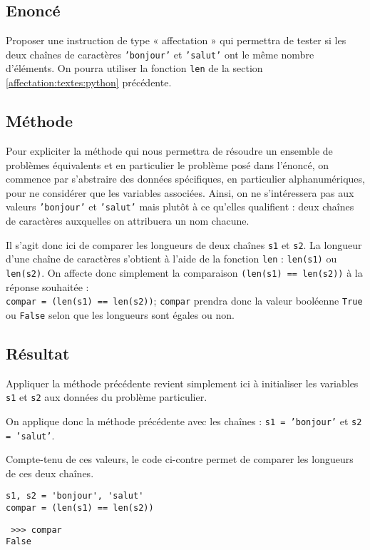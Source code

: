 \subsection{Enoncé}\label{affectation:textes:enonce}
Proposer une instruction de type « affectation » qui permettra de tester si les deux chaînes de 
caractères \texttt{'bonjour'} et \texttt{'salut'} ont le même nombre d'éléments.
On pourra utiliser la fonction \texttt{len} de la section \ref{affectation:textes:python} précédente.

\subsection{Méthode}\label{affectation:textes:methode}
Pour expliciter la méthode qui nous permettra de résoudre un ensemble de problèmes 
équivalents et en particulier le problème posé dans l'énoncé, on commence par s'abstraire 
des données spécifiques, en particulier alphanumériques, pour ne considérer que les variables associées. 
Ainsi, on ne s'intéressera pas aux valeurs \texttt{'bonjour'} et \texttt{'salut'} mais
plutôt à ce qu'elles qualifient : deux chaînes de caractères auxquelles on attribuera un nom chacune.

Il s'agit donc ici de comparer les longueurs de deux chaînes \texttt{s1} et \texttt{s2}.
La longueur d'une chaîne de caractères s'obtient à l'aide de la fonction \texttt{len} : 
\texttt{len(s1)} ou \texttt{len(s2)}. On affecte donc simplement la comparaison 
\texttt{(len(s1) == len(s2))} à la réponse souhaitée :\\
\texttt{compar = (len(s1) == len(s2))};
\texttt{compar} prendra donc la valeur booléenne \texttt{True} ou \texttt{False}
selon que les longueurs sont égales ou non.

\subsection{Résultat}\label{affectation:textes:resultat}
Appliquer la méthode précédente revient simplement ici à initialiser les variables
\texttt{s1} et \texttt{s2} aux données du problème particulier.

On applique donc la méthode précédente avec les chaînes : \texttt{s1 = 'bonjour'}
et \texttt{s2 = 'salut'}.

\noindent\begin{minipage}{7cm}
Compte-tenu de ces valeurs, le code \python{} ci-contre
permet de comparer les longueurs de ces deux chaînes.
\end{minipage}
\hfill
\begin{minipage}{8cm}
\begin{lstlisting}[caption=\textbf{comparaison de longueurs}]
s1, s2 = 'bonjour', 'salut'
compar = (len(s1) == len(s2))
\end{lstlisting}
\tt\footnotesize
>>> compar\\
False
\end{minipage}
\vspace*{2mm}

